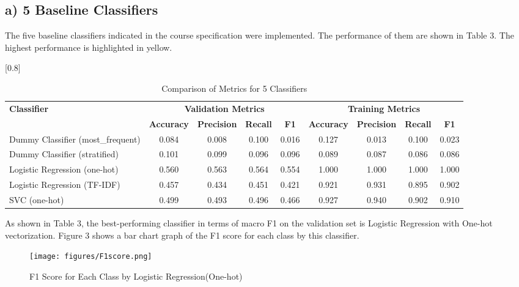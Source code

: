 \documentclass[a4paper,11pt]{article}
\begin{document}
\subsection{a) 5 Baseline Classifiers}
The five baseline classifiers indicated in the course specification were implemented.
The performance of them are shown in Table 3.
The highest performance is highlighted in yellow.

\begin{table}[htbp]
    \centering
    \caption{Comparison of Metrics for 5 Classifiers}
    \label{tab:classifier_metrics}
    \scalebox{0.8}[0.8]{
    \begin{tabular}{l|cccc|cccc}
        \hline
        \textbf{Classifier} & \multicolumn{4}{c|}{\textbf{Validation Metrics}} & \multicolumn{4}{c}{\textbf{Training Metrics}} \\
        & \textbf{Accuracy} & \textbf{Precision} & \textbf{Recall} & \textbf{F1} & \textbf{Accuracy} & \textbf{Precision} & \textbf{Recall} & \textbf{F1} \\
        \hline
        Dummy Classifier (most\_frequent) & {0.084} & 0.008 & 0.100 & 0.016 & 0.127 & 0.013 & 0.100 & 0.023 \\
        Dummy Classifier (stratified) & 0.101 & 0.099 & 0.096 & 0.096 & 0.089 & 0.087 & 0.086 & 0.086 \\
        \rowcolor[rgb]{0.9,0.9,0}Logistic Regression (one-hot) & \colorbox[rgb]{0.9, 0.9, 0}{0.560} & \colorbox[rgb]{0.9, 0.9, 0}{0.563} & \colorbox[rgb]{0.9, 0.9, 0}{0.564} & \colorbox[rgb]{0.9, 0.9, 0}{0.554} & 1.000 & 1.000 & 1.000 & 1.000 \\
        Logistic Regression (TF-IDF) & 0.457 & 0.434 & 0.451 & 0.421 & 0.921 & 0.931 & 0.895 & 0.902 \\
        SVC (one-hot) & 0.499 & 0.493 & 0.496 & 0.466 & 0.927 & 0.940 & 0.902 & 0.910 \\
        \hline
    \end{tabular}
    }
\end{table}

As shown in Table 3, the best-performing classifier in terms of macro F1 on the validation set is Logistic Regression with One-hot vectorization.
Figure 3 shows a bar chart graph of the F1 score for each class by this classifier.

\begin{figure}[htbp]
  \begin{center}
  \texttt{[image: figures/F1score.png]}
  \caption{F1 Score for Each Class by Logistic Regression(One-hot)}
  \end{center}
\end{figure}
\end{document}
